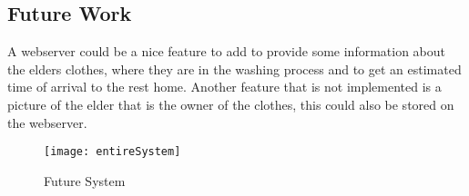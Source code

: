 \subsection{Future Work}
A webserver could be a nice feature to add to provide some information about the elders clothes, where they are in the washing process and to get an estimated time of arrival to the rest home. Another feature that is not implemented is a picture of the elder that is the owner of the clothes, this could also be stored on the webserver.

\begin{figure}[h]
	\centering
		\texttt{[image: entireSystem]}
	\caption{Future System}
	\label{fig:entireSystem}
\end{figure}
